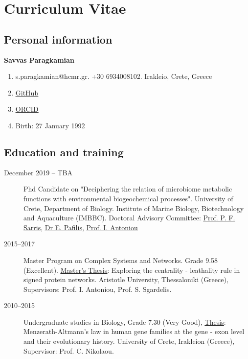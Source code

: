 \chapter{Curriculum Vitae}
\label{app:cv}

\section{Personal information}

\textbf{Savvas Paragkamian}

\begin{enumerate}

    \item[] s.paragkamian@hcmr.gr. +30 6934008102. Irakleio, Crete, Greece
    \item[] \underline{\href{https://github.com/savvas-paragkamian}{GitHub}}
    \item[] \underline{\href{https://orcid.org/0000-0002-8508-2521}{ORCID}}
    \item[] Birth: 27 January 1992
\end{enumerate}
  
\section{Education and training}

\begin{description}
    \item[December 2019 -- TBA] Phd Candidate on "Deciphering the relation of microbiome metabolic functions with environmental biogeochemical processes".
    University of Crete, Department of Biology. Institute of Marine Biology, Biotechnology and Aquaculture (IMBBC).
Doctoral Advisory Committee: \underline{\href{https://www.imbb.forth.gr/imbb-people/en/sarris-home}{Prof. P. F. Sarris}}, \underline{\href{http://lab42open.hcmr.gr}{Dr E. Pafilis}}, \underline{\href{https://cosynet.auth.gr/didaskontes-instructors/}{Prof. I. Antoniou}}
  
    \item[2015--2017] Master Program on Complex Systems and Networks. Grade 9.58 (Excellent).
    \underline{\href{https://doi.org/10.13140/RG.2.2.32339.63520}{Master's Thesis}}: Exploring the centrality - leathality rule in signed protein networks.
    Aristotle University, Thessaloniki (Greece), Supervisors: Prof. I. Antoniou, Prof. S. Sgardelis.

    \item[2010--2015] Undergraduate studies in Biology, Grade 7.30 (Very Good),
        \underline{\href{http://dx.doi.org/10.13140/RG.2.2.25628.74886}{Thesis}}:
        Menzerath-Altmann's law in human gene families at the gene - exon level and their evolutionary history.
        University of Crete, Irakleion (Greece), Supervisor: Prof. C. Nikolaou.
  
\end{description}

